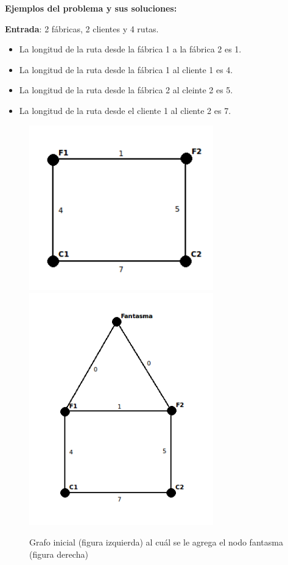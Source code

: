 \documentclass[a4paper, 10pt, twoside]{article}
\begin{document}
\textbf{Ejemplos del problema y sus soluciones:}

\textbf{Entrada}: 2 fábricas, 2 clientes y 4 rutas.
\begin{itemize}
\item{La longitud de la ruta desde la fábrica 1 a la fábrica 2 es 1.}
\item{La longitud de la ruta desde la fábrica 1 al cliente 1 es 4.}
\item{La longitud de la ruta desde la fábrica 2 al cleinte 2 es 5.}
\item{La longitud de la ruta desde el cliente 1 al cliente 2 es 7.}
\end{itemize}

\begin{figure}[H]
\includegraphics[width=80mm]{../ejemplo_graficos/CosoDosSubconjuntos.png}
\includegraphics[width=80mm]{../ejemplo_graficos/CosoDosSubconjuntosConNodoFantasma.png}
\caption{Grafo inicial (figura izquierda) al cuál se le agrega el nodo fantasma (figura derecha)}
\end{figure} 
\end{document}
